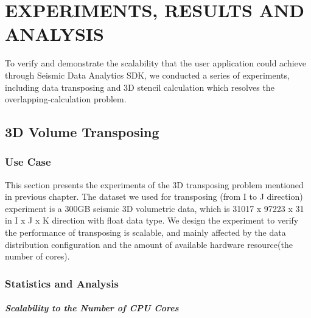 %
%
%


\chapter{\uppercase{Experiments, Results and Analysis}}

To verify and demonstrate the scalability that the user application could achieve through Seismic Data Analytics SDK, we conducted a series of experiments, including data transposing and 3D stencil calculation which resolves the overlapping-calculation problem. 

\section{3D Volume Transposing}

\subsection{Use Case}

This section presents the experiments of the 3D transposing problem mentioned in previous chapter. The dataset we used for transposing (from I  to J direction) experiment is a 300GB seismic 3D volumetric data, which is 31017 x 97223 x 31 in I x J x K direction with float data type. 
We design the experiment to verify the performance of transposing is scalable, and mainly affected by the data distribution configuration and the amount of available hardware resource(the number of cores).

\subsection{Statistics and Analysis}

\paragraph{Scalability to the Number of CPU Cores}

